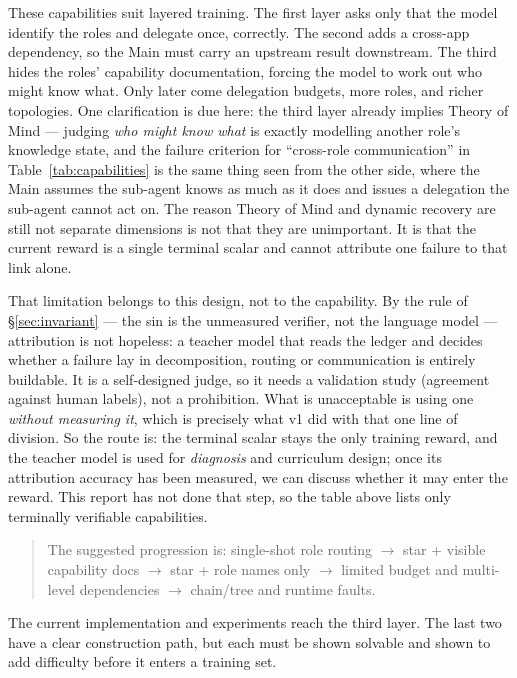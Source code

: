 \documentclass[11pt,a4paper]{article}
\begin{document}
These capabilities suit layered training. The first layer asks only that the model identify the roles and delegate once, correctly. The second adds a cross-app dependency, so the Main must carry an upstream result downstream. The third hides the roles' capability documentation, forcing the model to work out who might know what. Only later come delegation budgets, more roles, and richer topologies. One clarification is due here: the third layer already implies Theory of Mind --- judging \emph{who might know what} is exactly modelling another role's knowledge state, and the failure criterion for ``cross-role communication'' in Table~\ref{tab:capabilities} is the same thing seen from the other side, where the Main assumes the sub-agent knows as much as it does and issues a delegation the sub-agent cannot act on. The reason Theory of Mind and dynamic recovery are still not separate dimensions is not that they are unimportant. It is that the current reward is a single terminal scalar and cannot attribute one failure to that link alone.

That limitation belongs to this design, not to the capability. By the rule of \S\ref{sec:invariant} --- the sin is the unmeasured verifier, not the language model --- attribution is not hopeless: a teacher model that reads the ledger and decides whether a failure lay in decomposition, routing or communication is entirely buildable. It is a self-designed judge, so it needs a validation study (agreement against human labels), not a prohibition. What is unacceptable is using one \emph{without measuring it}, which is precisely what v1 did with that one line of division. So the route is: the terminal scalar stays the only training reward, and the teacher model is used for \emph{diagnosis} and curriculum design; once its attribution accuracy has been measured, we can discuss whether it may enter the reward. This report has not done that step, so the table above lists only terminally verifiable capabilities.

\begin{quote}
\small
\noindent The suggested progression is: single-shot role routing $\rightarrow$ star + visible capability docs $\rightarrow$
star + role names only $\rightarrow$ limited budget and multi-level dependencies $\rightarrow$ chain/tree and runtime faults.
\end{quote}

The current implementation and experiments reach the third layer. The last two have a clear construction path, but each must be shown solvable and shown to add difficulty before it enters a training set.
\end{document}
